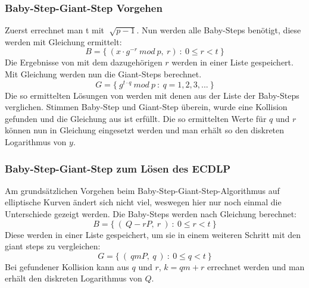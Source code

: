		\subsubsection{Baby-Step-Giant-Step Vorgehen}
			Zuerst errechnet man t mit $\sqrt[]{p-1}$. Nun werden alle Baby-Steps benötigt, diese werden mit Gleichung  ermittelt:
			\begin{equation}
				B = \{~(x \cdot g^{-r}~mod~p,~r)~:~0 \leq r < t~\}
			\label{Gleichung Baby steps}
			\end{equation}
			Die Ergebnisse von  mit dem dazugehörigen $r$ werden in einer Liste gespeichert. Mit Gleichung  werden nun die Giant-Steps berechnet.
			\begin{equation}
				G = \{~g^{t \cdot q}~mod~p~:~q = 1,2,3,...~\}
			\label{Gleichung Giant steps}
			\end{equation}
			Die so ermittelten Lösungen von  werden mit denen aus der Liste der Baby-Steps verglichen. Stimmen Baby-Step und Giant-Step überein, wurde eine Kollision gefunden und die Gleichung aus  ist erfüllt. Die so ermittelten Werte für $q$ und $r$ können nun in Gleichung  eingesetzt werden und man erhält so den diskreten Logarithmus von $y$.
		\subsubsection{Baby-Step-Giant-Step zum Lösen des ECDLP}
			Am grundsätzlichen Vorgehen beim Baby-Step-Giant-Step-Algorithmus auf elliptische Kurven ändert sich nicht viel, weswegen hier nur noch einmal die Unterschiede gezeigt werden. Die Baby-Steps werden nach Gleichung  berechnet:
			\begin{equation}
				B = \{~(~Q- rP,~r~)~:~0 \leq r < t~\}
				\label{Gleichung Baby steps für elliptische Kurven}
			\end{equation}
			Diese werden in einer Liste gespeichert, um sie in einem weiteren Schritt mit den giant steps zu vergleichen:
			\begin{equation}
				G = \{~(~qmP,~q~)~:~0 \leq q < t~\}
				\label{Gleichung Giant steps für elliptische Kurven}
			\end{equation}
			Bei gefundener Kollision kann aus $q$ und $r$, $k = qm + r$ errechnet werden und man erhält den diskreten Logarithmus von $Q$.

